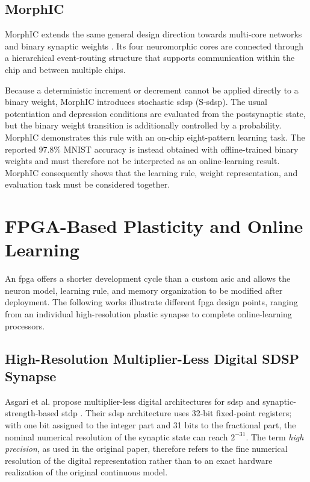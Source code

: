 \subsection{MorphIC}

MorphIC extends the same general design direction towards multi-core networks and binary synaptic weights \cite{Frenkel2019MorphIC}. Its four neuromorphic cores are connected through a hierarchical event-routing structure that supports communication within the chip and between multiple chips.

Because a deterministic increment or decrement cannot be applied directly to a binary weight, MorphIC introduces stochastic \gls{sdsp} (S-\gls{sdsp}). The usual potentiation and depression conditions are evaluated from the postsynaptic state, but the binary weight transition is additionally controlled by a probability. MorphIC demonstrates this rule with an on-chip eight-pattern learning task. The reported 97.8\% MNIST accuracy is instead obtained with offline-trained binary weights and must therefore not be interpreted as an online-learning result. MorphIC consequently shows that the learning rule, weight representation, and evaluation task must be considered together.

\section{FPGA-Based Plasticity and Online Learning}
\label{subsec: fpga online learning processors}

An \gls{fpga} offers a shorter development cycle than a custom \gls{asic} and allows the neuron model, learning rule, and memory organization to be modified after deployment. The following works illustrate different \gls{fpga} design points, ranging from an individual high-resolution plastic synapse to complete online-learning processors.

\subsection{High-Resolution Multiplier-Less Digital SDSP Synapse}

Asgari et al. propose multiplier-less digital architectures for \gls{sdsp} and synaptic-strength-based \gls{stdp} \cite{Asgari2020SDSP}. Their \gls{sdsp} architecture uses 32-bit fixed-point registers; with one bit assigned to the integer part and 31 bits to the fractional part, the nominal numerical resolution of the synaptic state can reach $2^{-31}$. The term \emph{high precision}, as used in the original paper, therefore refers to the fine numerical resolution of the digital representation rather than to an exact hardware realization of the original continuous model.

